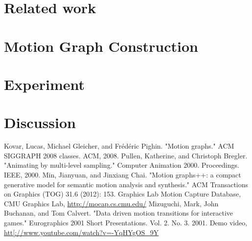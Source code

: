 \documentclass[twocolumn, 11pt]{article}  %
\begin{document}
\section{Related work}



\section{Motion Graph Construction}


\section{Experiment}


\section{Discussion}



\begin{thebibliography}{i}
 {Kovar, Lucas, Michael Gleicher, and Frédéric Pighin. "Motion graphs." ACM SIGGRAPH 2008 classes. ACM, 2008.}
 {Pullen, Katherine, and Christoph Bregler. "Animating by multi-level sampling." Computer Animation 2000. Proceedings. IEEE, 2000.} 
 {Min, Jianyuan, and Jinxiang Chai. "Motion graphs++: a compact generative model for semantic motion analysis and synthesis." ACM Transactions on Graphics (TOG) 31.6 (2012): 153.}
 {\emCMU Graphics Lab Motion Capture Database}, CMU Graphics Lab, \url{http://mocap.cs.cmu.edu/}
 {Mizuguchi, Mark, John Buchanan, and Tom Calvert. "Data driven motion transitions for interactive games." Eurographics 2001 Short Presentations. Vol. 2. No. 3. 2001.}
 {Demo video}, \url {htt[://www.youtube.com/watch?v=-YqHYgOS_9Y}
\end{thebibliography}
\end{document}
